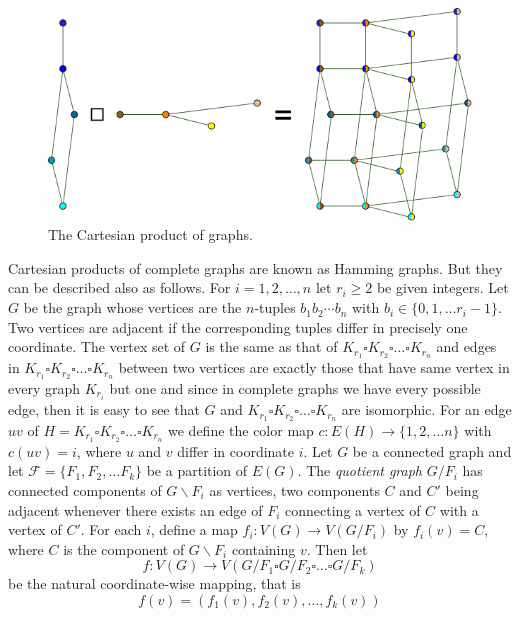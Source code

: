 \documentclass[12pt,a4paper,titlepage,openany]{report}
\begin{document}
\begin{figure}\label{fig:cartProduct}
\centering
\includegraphics[scale=0.45]{figures/Graph-Cartesian-product.png}
\caption{The Cartesian product of graphs.}

\end{figure}
Cartesian products of complete graphs are known as Hamming graphs. But they can be described also as follows. For
$i=1,2,\ldots, n$ let $r_i\geq 2$ be given integers. Let $G$ be the graph whose vertices are the $n$-tuples $b_1b_2\cdots b_n$ with $b_i\in \{0,1,\ldots r_i-1\}$. Two vertices are adjacent if the corresponding tuples differ in precisely one coordinate. The vertex set of $G$ is the same as that of $K_{r_1}\square K_{r_2}\square \ldots \square K_{r_n}$ and edges in $K_{r_1}\square K_{r_2}\square \ldots \square K_{r_n}$ between two vertices are exactly those that have same vertex in every graph $K_{r_i}$ but one and since in complete graphs we have every possible edge, then it is easy to see that $G$ and $K_{r_1}\square K_{r_2}\square \ldots \square K_{r_n}$ are isomorphic. For an edge $uv$ of
$H=K_{r_1}\square K_{r_2}\square \ldots \square K_{r_n}$ we define the color map $c:E(H)\rightarrow \{1,2,\ldots n\}$ with $c(uv)=i$, where $u$ and $v$ differ in coordinate $i$.
\newline
Let $G$ be a connected graph and let $\mathcal{F}=\{F_1,F_2,\ldots F_k\}$ be a partition of $E(G)$. The \textit{quotient graph} $G/ F_i$ has connected components of $G\backslash F_i$ as vertices, two components $C$ and $C'$ being adjacent whenever there exists an edge of $F_i$ connecting a vertex of $C$ with a vertex of $C'$. For each $i$, define a map $f_i:V(G)\rightarrow V(G/ F_i)$ by $f_i(v)=C$, where $C$ is the component of $G\backslash F_i$ containing $v$. Then let
$$f:V(G)\to V(G/ F_1\square G/ F_2\square \ldots \square G/ F_k)$$
be the natural coordinate-wise mapping, that is
$$f(v)=(f_1(v),f_2(v),\ldots , f_k(v))$$
\end{document}
